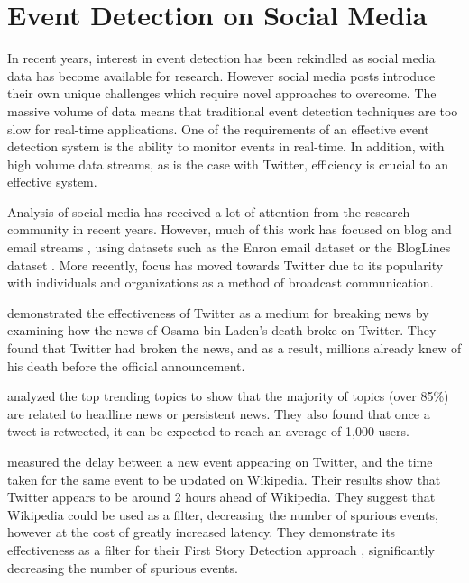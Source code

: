 \section{Event Detection on Social Media}
In recent years, interest in event detection has been rekindled as social media data has become available for research. However social media posts introduce their own unique challenges which require novel approaches to overcome. The massive volume of data means that traditional event detection techniques are too slow for real-time applications. One of the requirements of an effective event detection system is the ability to monitor events in real-time. In addition, with high volume data streams, as is the case with Twitter, efficiency is crucial to an effective system.

Analysis of social media has received a lot of attention from the research community in recent years. However, much of this work has focused on blog and email streams  \citep{Zhao:2007:TIF:1619797.1619886,Jurgens:2009:EDB:1859650.1859652,Becker:2010:LSM:1718487.1718524,Nguyen:2011:ERR:2186701.2186707}, using datasets such as the Enron email dataset \cite{citeulike:7616867} or the BlogLines dataset \citep{Sia:2008:ECP:1401890.1401967}. More recently, focus has moved towards Twitter due to its popularity with individuals and organizations as a method of broadcast communication.

\cite{Hu:2012:BNT:2208636.2208672} demonstrated the effectiveness of Twitter as a medium for breaking news by examining how the news of Osama bin Laden's death broke on Twitter. They found that Twitter had broken the news, and as a result, millions already knew of his death before the official announcement.

\cite{Kwak:2010:TSN:1772690.1772751} analyzed the top trending topics to show that the majority of topics (over 85\%) are related to headline news or persistent news. They also found that once a tweet is retweeted, it can be expected to reach an average of 1,000 users.

\cite{WRN2012:osbornebieber} measured the delay between a new event appearing on Twitter, and the time taken for the same event to be updated on Wikipedia. Their results show that Twitter appears to be around 2 hours ahead of Wikipedia. They suggest that Wikipedia could be used as a filter, decreasing the number of spurious events, however at the cost of greatly increased latency. They demonstrate its effectiveness as a filter for their First Story Detection approach \citep{Petrovic:2010:SFS:1857999.1858020}, significantly decreasing the number of spurious events.

